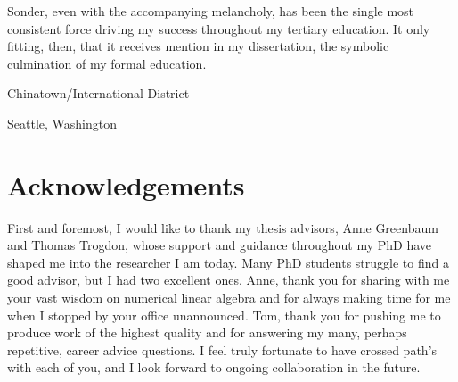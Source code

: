 Sonder, even with the accompanying melancholy, has been the single most consistent force driving my success throughout my tertiary education.
It only fitting, then, that it receives mention in my dissertation, the symbolic culmination of my formal education.




\iffalse
I continually find myself chasing certain aesthetic emotions.
After hours, sonder is perhaps the 


emotional aesthetic,

I hope this thesis invokes such 

editorial control.

This is expressed in two main ways. First, exposition

Second typesetting

but also in the typesetting and 
\fi

\begin{flushright}
\vspace{5em}
Chinatown/International District
\vspace{-.7em}

Seattle, Washington %
\end{flushright}




\clearpage
\section*{Acknowledgements}


First and foremost, I would like to thank my thesis advisors, Anne Greenbaum and Thomas Trogdon, whose support and guidance throughout my PhD have shaped me into the researcher I am today.
Many PhD students struggle to find a good advisor, but I had two excellent ones.
Anne, thank you for sharing with me your vast wisdom on numerical linear algebra and for always making time for me when I stopped by your office unannounced.
Tom, thank you for pushing me to produce work of the highest quality and for answering my many, perhaps repetitive, career advice questions.
I feel truly fortunate to have crossed path's with each of you, and I look forward to ongoing collaboration in the future.

